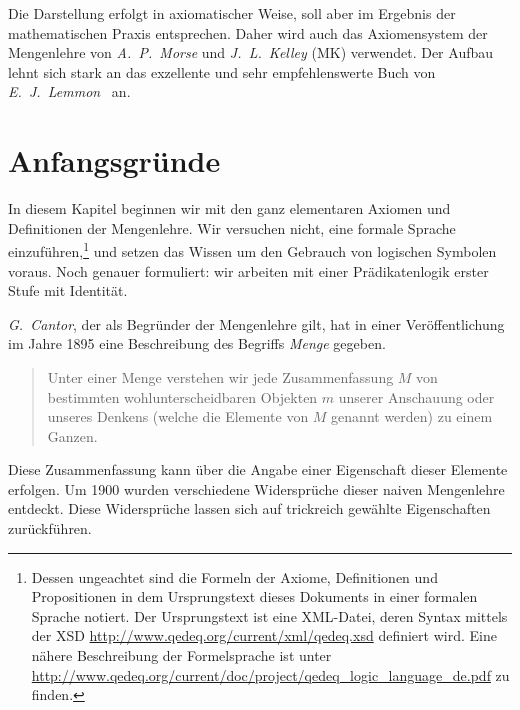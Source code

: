 \documentclass[a4paper,german,10pt,twoside]{book}
\theoremstyle{definition}
\theoremstyle{remark}
\begin{document}
\par
Die Darstellung erfolgt in axiomatischer Weise, soll aber im Ergebnis der mathematischen Praxis entsprechen. Daher wird auch das Axiomensystem der Mengenlehre von \emph{A.~P.~Morse} und  \emph{J.~L.~Kelley} (MK) verwendet. Der Aufbau lehnt sich stark an das exzellente und sehr empfehlenswerte Buch von \emph{E.~J.~Lemmon}~\cite{lemmon} an.


\chapter{Anfangsgr{\"u}nde} \label{chapter3} \hypertarget{chapter3}{}

In diesem Kapitel beginnen wir mit den ganz elementaren Axiomen und Definitionen der Mengenlehre. Wir versuchen nicht, eine formale Sprache einzuf{\"u}hren,\footnote{Dessen ungeachtet sind die Formeln der Axiome, Definitionen und Propositionen in dem Ursprungstext dieses Dokuments in einer formalen Sprache notiert. Der Ursprungstext ist eine XML-Datei, deren Syntax mittels der XSD \url{http://www.qedeq.org/current/xml/qedeq.xsd} definiert wird. Eine n{\"a}here Beschreibung der Formelsprache ist unter \url{http://www.qedeq.org/current/doc/project/qedeq_logic_language_de.pdf} zu finden.} und setzen das Wissen um den Gebrauch von logischen Symbolen voraus. Noch genauer formuliert: wir arbeiten mit einer Pr{\"a}dikatenlogik erster Stufe mit Identit{\"a}t.

\par{}
\emph{G.~Cantor}, der als Begr{\"u}nder der Mengenlehre gilt, hat in einer Ver{\"o}ffentlichung im Jahre 1895 eine Beschreibung des Begriffs \emph{Menge} gegeben.

\begin{quote}
 Unter einer {\glqq Menge\grqq} verstehen wir jede Zusammenfassung $M$ von bestimmten wohlunterscheidbaren Objekten $m$ unserer Anschauung oder unseres Denkens (welche die {\glqq Elemente\grqq} von $M$ genannt werden) zu einem Ganzen.
\end{quote}

\par
Diese Zusammenfassung kann {\"u}ber die Angabe einer Eigenschaft dieser Elemente erfolgen. Um 1900 wurden verschiedene Widerspr{\"u}che dieser naiven Mengenlehre entdeckt. Diese Widerspr{\"u}che lassen sich auf trickreich gew{\"a}hlte Eigenschaften zur{\"u}ckf{\"u}hren.
\end{document}
